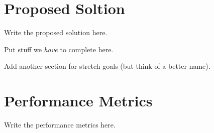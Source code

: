 \documentclass[10pt,journal,draftclsnofoot,onecolumn]{IEEEtran}
\begin{document}
\section{Proposed Soltion}
Write the proposed solution here.

Put stuff we \textit{have} to complete here.

Add another section for stretch goals (but think of a better name).

\section{Performance Metrics}
Write the performance metrics here.
\end{document}
